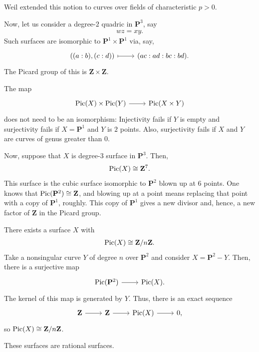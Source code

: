 \documentclass [11 pt, oneside] {article}
\begin{document}
Weil extended this notion to curves over fields of characteristic $p>0$.

Now, let us consider a degree-$2$ quadric in $\mathbf{P}^3$, say
\begin{align*}
	wz=xy.
\end{align*}
Such surfaces are isomorphic to $\mathbf{P}^1\times\mathbf{P}^1$ via, say,
\[
\begin{tikzcd}
	((a:b), (c:d) )\ar[r,mapsto] & (ac:ad:bc:bd).
\end{tikzcd}
\]
The Picard group of this is $\mathbf{Z}\times \mathbf{Z}$.

The map
\[
\begin{tikzcd}
	\Pic(X)\times\Pic (Y)\ar[r]&\Pic (X\times Y)
\end{tikzcd}
\]
does not need to be an isomorphism: Injectivity fails if $Y$ is empty and surjectivity fails if $X=\mathbf{P}^1$ and $Y$ is $2$ points. Also, surjectivity fails if $X$ and $Y$ are curves of genus greater than $0$.

Now, suppose that $X$ is degree-$3$ surface in $\mathbf{P}^3$. Then,
\begin{align*}
	\operatorname{Pic}(X)\cong  \mathbf{Z}^7.
\end{align*}
This surface is the cubic surface isomorphic to $\mathbf{P}^2$ blown up at $6$ points. One knows that $\operatorname{Pic}(\mathbf{P}^2)\cong \mathbf{Z}$, and blowing up at a point means replacing that point with a copy of $\mathbf{P}^1$, roughly.
This copy of $\mathbf{P}^1$ gives a new divisor and, hence, a new factor of $\mathbf{Z}$ in the Picard group.

There exists a surface $X$ with 
\begin{align*}
	\operatorname{Pic}(X) \cong  \mathbf{Z}/n\mathbf{Z}.
\end{align*}
Take a nonsingular curve $Y$ of degree $n$ over $\mathbf{P}^2$ and consider $X = \mathbf{P}^2-Y$. Then, there is a surjective map
\[
\begin{tikzcd}
	\Pic(\mathbf{P}^2)\ar[r]&\Pic(X).
\end{tikzcd}
\]
The kernel of this map is generated by $Y$. Thus, there is an exact sequence
\[
\begin{tikzcd}
	\mathbf{Z}\ar[r]&\mathbf{Z}\ar[r]&\Pic(X)\ar[r]&0,
\end{tikzcd}
\]
so $\operatorname{Pic}(X)\cong  \mathbf{Z}/n\mathbf{Z}$.

\begin{remark}
	These surfaces are rational surfaces.
\end{remark}
\end{document}
